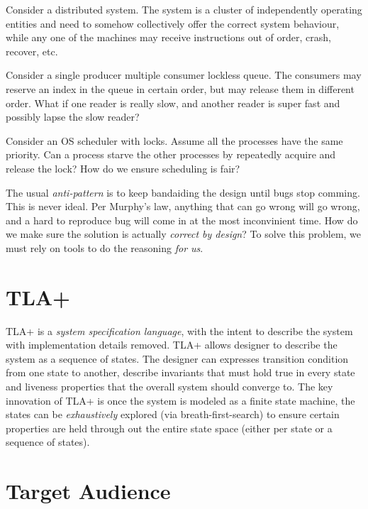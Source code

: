 Consider a distributed system. The system is a cluster of independently
operating entities and need to somehow collectively offer the correct system
behaviour, while any one of the machines may receive instructions out of order,
crash, recover, etc. \newline

Consider a single producer multiple consumer lockless queue. The consumers may 
reserve an index in the queue in certain order, but may release them in different order. 
What if one reader is really slow, and another reader is super fast and possibly 
lapse the slow reader? \newline

Consider an OS scheduler with locks. Assume all the processes have the same
priority. Can a process starve the other processes by repeatedly acquire and
release the lock? How do we ensure scheduling is fair?\newline

The usual \textit{anti-pattern} is to keep bandaiding the design until bugs stop
comming. This is never ideal. Per Murphy's law, anything that can go wrong will
go wrong, and a hard to reproduce bug will come in at the most inconvinient
time. How do we make sure the solution is actually \textit{correct by design}?
To solve this problem, we must rely on tools to do the reasoning \textit{for
us}.

\section{TLA+}

TLA+ is a \textit{system specification language}, with the intent to describe
the system with implementation details removed. TLA+ allows designer to describe
the system as a sequence of states. The designer can expresses transition
condition from one state to another, describe invariants that must hold true in
every state and liveness properties that the overall system should converge to.
The key innovation of TLA+ is once the system is modeled as a finite state
machine, the states can be \textit{exhaustively} explored (via
breath-first-search) to ensure certain properties are held through out the
entire state space (either per state or a sequence of states).\newline

\section{Target Audience}

